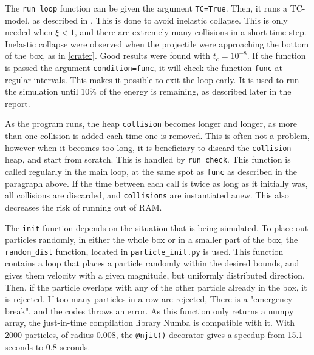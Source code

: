 \documentclass{article}
\begin{document}
    
    The \verb|run_loop| function can be given the argument \verb|TC=True|.
    Then, it runs a TC-model, as described in \cite{TC}.
    This is done to avoid inelastic collapse.
    This is only needed when $\xi<1$, and there are extremely many collisions in a short time step.
    Inelastic collapse were observed when the projectile were approaching the bottom of the box, as in \autoref{crater}.
    Good results were found with $t_c = 10^{-8}$.
    If the function is passed the argument \verb|condition=func|, it will check the function \verb|func| at regular intervals.
    This makes it possible to exit the loop early.
    It is used to run the simulation until $10\%$ of the energy is remaining, as described later in the report.


    As the program runs, the heap \verb|collision| becomes longer and longer, as more than one collision is added each time one is removed.
    This is often not a problem, however when it becomes too long, it is beneficiary to discard the \verb|collision| heap, and start from scratch.
    This is handled by \verb|run_check|.
    This function is called regularly in the main loop, at the same spot as \verb|func| as described in the paragraph above.
    If the time between each call is twice as long as it initially was, all collisions are discarded, and \verb|collisions| are instantiated anew.
    This also decreases the risk of running out of RAM.

    The \verb|init| function depends on the situation that is being simulated.
    To place out particles randomly, in either the whole box or in a smaller part of the box, the \verb|random_dist| function, located in \verb|particle_init.py| is used.
    This function contains a loop that places a particle randomly within the desired bounds, and gives them velocity with a given magnitude, but uniformly distributed direction.
    Then, if the particle overlaps with any of the other particle already in the box, it is rejected.
    If too many particles in a row are rejected, There is a "emergency break", and the codes throws an error.
    As this function only returns a numpy array, the just-in-time compilation library Numba is compatible with it.
    With 2000 particles, of radius 0.008, the \verb|@njit()|-decorator gives a speedup from 15.1 seconds to 0.8 seconds.
\end{document}
